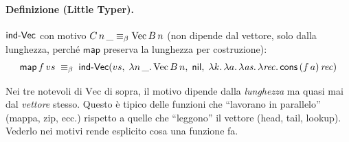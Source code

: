 \paragraph{Definizione (Little Typer).} $\mathsf{ind\text{-}Vec}$ con motivo $C\,n\,\_ \equiv_{\beta} \mathrm{Vec}\,B\,n$ (non dipende dal vettore, solo dalla lunghezza, perch\'e $\mathsf{map}$ preserva la lunghezza per costruzione):
\[
\mathsf{map}\,f\,vs \;\equiv_{\beta}\; \mathsf{ind\text{-}Vec}(vs,\;\lambda n\,\_.\,\mathrm{Vec}\,B\,n,\;\mathsf{nil},\;\lambda k.\,\lambda a.\,\lambda \mathit{as}.\,\lambda\mathit{rec}.\,\mathsf{cons}\,(f\,a)\,\mathit{rec})
\]

\begin{oss}
Nei tre notevoli di $\mathrm{Vec}$ di sopra, il motivo dipende dalla \emph{lunghezza} ma quasi mai dal \emph{vettore} stesso. Questo \`e tipico delle funzioni che ``lavorano in parallelo'' (mappa, zip, ecc.) rispetto a quelle che ``leggono'' il vettore (head, tail, lookup). Vederlo nei motivi rende esplicito cosa una funzione fa.
\end{oss}
